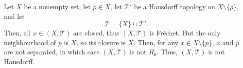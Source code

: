 \begin{example}
	\label{eg: T_1 but not T_2}
	Let $X$ be a nonempty set, let $p \in X$, let $\mathcal T'$ be a Hausdorff topology on $X \setminus \{p\}$, and let
	$$
	\mathcal T = \{X\} \cup \mathcal T'.
	$$
	Then, all $x \in (X, \mathcal T)$ are closed, thus $(X, \mathcal T)$ is Fr\'echet. But the only neighbourhood of $p$ is $X$, so its closure is $X$. Then, for any $x \in X \setminus \{p\}$, $x$ and $p$ are not separated, in which case $(X, \mathcal T)$ is not $R_0$. Thus, $(X, \mathcal T)$ is not Hausdorff.
\end{example}

